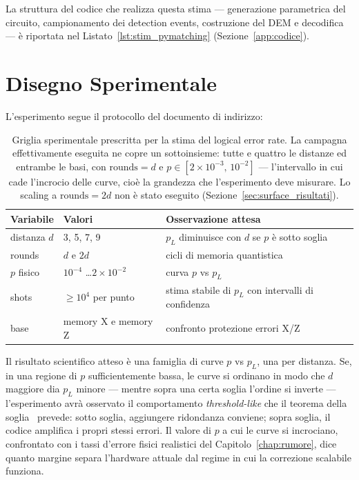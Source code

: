 \begin{onehalfspace}
\noindent La struttura del codice che realizza questa stima --- generazione parametrica del circuito, campionamento dei detection events, costruzione del \ac{DEM} e decodifica --- è riportata nel Listato~\ref{lst:stim_pymatching} (Sezione~\ref{app:codice}).

\section{Disegno Sperimentale}
\label{sec:surface_esperimento}

L'esperimento segue il protocollo del documento di indirizzo:

\begin{table}[H]
\centering
\begin{tabularx}{\textwidth}{llX}
\toprule
\textbf{Variabile} & \textbf{Valori} & \textbf{Osservazione attesa} \\
\midrule
distanza $d$ & 3, 5, 7, 9 & $p_L$ diminuisce con $d$ se $p$ è sotto soglia \\
rounds & $d$ e $2d$ & cicli di memoria quantistica \\
$p$ fisico & $10^{-4}$ \dots $2 \times 10^{-2}$ & curva $p$ vs $p_L$ \\
shots & $\geq 10^4$ per punto & stima stabile di $p_L$ con intervalli di confidenza \\
base & memory X e memory Z & confronto protezione errori X/Z \\
\bottomrule
\end{tabularx}
\caption[Disegno sperimentale surface code]{Griglia sperimentale prescritta per la stima del logical error rate. La campagna effettivamente eseguita ne copre un sottoinsieme: tutte e quattro le distanze ed entrambe le basi, con $\text{rounds} = d$ e $p \in [2\times10^{-3},\, 10^{-2}]$ --- l'intervallo in cui cade l'incrocio delle curve, cioè la grandezza che l'esperimento deve misurare. Lo scaling a $\text{rounds}=2d$ non è stato eseguito (Sezione~\ref{sec:surface_risultati}).}
\label{tab:surface_esperimento}
\end{table}

Il risultato scientifico atteso è una famiglia di curve $p$ vs $p_L$, una per distanza. Se, in una regione di $p$ sufficientemente bassa, le curve si ordinano in modo che $d$ maggiore dia $p_L$ minore --- mentre sopra una certa soglia l'ordine si inverte --- l'esperimento avrà osservato il comportamento \emph{threshold-like} che il teorema della soglia~\cite{aharonov1997fault} prevede: sotto soglia, aggiungere ridondanza conviene; sopra soglia, il codice amplifica i propri stessi errori. Il valore di $p$ a cui le curve si incrociano, confrontato con i tassi d'errore fisici realistici del Capitolo~\ref{chap:rumore}, dice quanto margine separa l'hardware attuale dal regime in cui la correzione scalabile funziona.


\end{onehalfspace}
